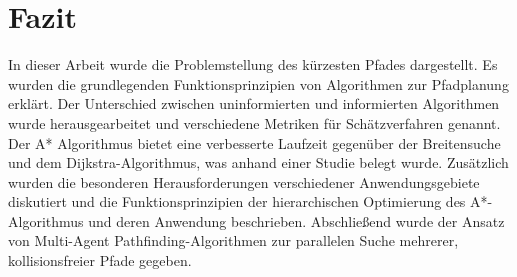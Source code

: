 \chapter{Fazit}

In dieser Arbeit wurde die Problemstellung des kürzesten Pfades dargestellt. Es wurden die grundlegenden Funktionsprinzipien von Algorithmen zur Pfadplanung erklärt. Der Unterschied zwischen uninformierten und informierten Algorithmen wurde herausgearbeitet und verschiedene Metriken für Schätzverfahren genannt. Der A* Algorithmus bietet eine verbesserte Laufzeit gegenüber der Breitensuche und dem Dijkstra-Algorithmus, was anhand einer Studie belegt wurde. Zusätzlich wurden die besonderen Herausforderungen verschiedener Anwendungsgebiete diskutiert und die Funktionsprinzipien der hierarchischen Optimierung des A*-Algorithmus und deren Anwendung beschrieben. Abschließend wurde der Ansatz von Multi-Agent Pathfinding-Algorithmen zur parallelen Suche mehrerer, kollisionsfreier Pfade gegeben.